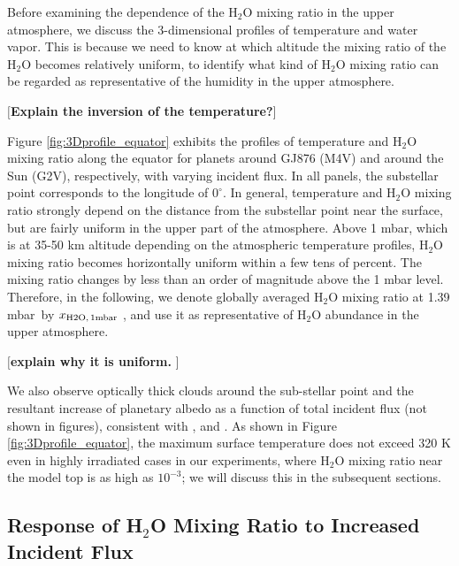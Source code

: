 \documentclass[11pt,numberedappendix,twocolappendix,]{emulateapj}
\def\water{H$_2$O }
\def\xwater{$x_{\rm H2O,\,1mbar}$ }
\def\preslevel{1.39 mbar\ }
\def\memo#1{\color{red}$[${\bf #1}$]$ \color{black}}
\begin{document}
Before examining the dependence of the \water mixing ratio in the upper atmosphere, we discuss the 3-dimensional profiles of temperature and water vapor. 
This is because we need to know at which altitude the mixing ratio of the \water becomes relatively uniform, to identify what kind of \water mixing ratio can be regarded as representative of the humidity in the upper atmosphere. 

\memo{Explain the inversion of the temperature?}

Figure \ref{fig:3Dprofile_equator} exhibits the profiles of temperature and \water mixing ratio along the equator for planets around GJ876 (M4V) and around the Sun (G2V), respectively, with varying incident flux. 
In all panels, the substellar point corresponds to the longitude of $0^{\circ }$. 
In general, temperature and \water mixing ratio strongly depend on the distance from the substellar point near the surface, but are fairly uniform in the upper part of the atmosphere. 
Above 1 mbar, which is at 35-50 km altitude depending on the atmospheric temperature profiles, \water mixing ratio becomes horizontally uniform within a few tens of percent. 
The mixing ratio changes by less than an order of magnitude above the 1 mbar level. 
Therefore, in the following, we denote globally averaged \water mixing ratio at \preslevel  by \xwater, and use it as representative of \water abundance in the upper atmosphere. 

\memo{explain why it is uniform. }

We also observe optically thick clouds around the sub-stellar point and the resultant increase of planetary albedo as a function of total incident flux (not shown in figures), consistent with \citet{Yang2013,Yang2014}, \citet{Kopparapu2016} and \citet{Way2016}. 
As shown in Figure \ref{fig:3Dprofile_equator}, the maximum surface temperature does not exceed 320 K even in highly irradiated cases in our experiments, where \water mixing ratio near the model top is as high as $10^{-3}$; we will discuss this in the subsequent sections. 


\subsection{Response of \water Mixing Ratio to Increased Incident Flux}
\label{ss:result_H2Omixingratio}
\end{document}
